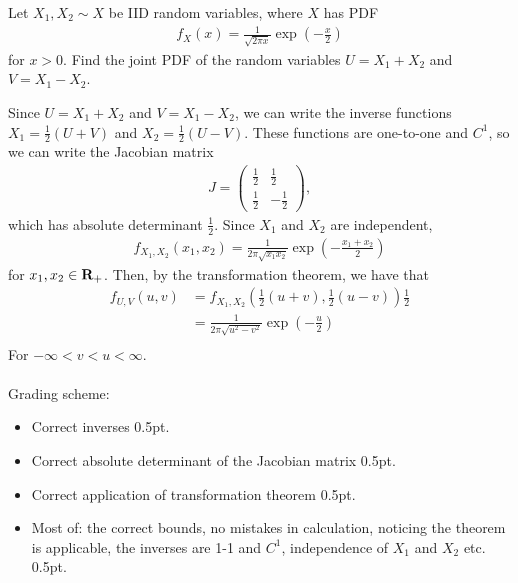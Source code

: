 \begin{exercise}[2]
Let $X_1,X_2\sim X$ be IID random variables, where $X$ has PDF
\begin{align*}
    f_X(x) = \frac{1}{\sqrt{2\pi x}}\exp{\left(-\frac{x}{2}\right)}
\end{align*}
for $x>0$. Find the joint PDF of the random variables $U = X_1+X_2$ and $V = X_1-X_2$.
\begin{solution}
Since $U = X_1 +X_2$ and $V = X_1-X_2$, we can write the inverse functions $X_1 = \frac12(U+V)$ and $X_2 = \frac12(U-V)$. These functions are one-to-one and $C^1$, so we can write the Jacobian matrix
\begingroup
\renewcommand*{\arraystretch}{1.5}
\begin{align*}
    J = \begin{pmatrix}
    \frac12 & \frac12\\
    \frac12 & -\frac12
    \end{pmatrix},
\end{align*}
\endgroup
which has absolute determinant $\frac12$. Since $X_1$ and $X_2$ are independent,
\begin{align*}
    f_{X_1,X_2}(x_1,x_2) = \frac{1}{2\pi\sqrt{x_1x_2}}\exp{\left(-\frac{x_1+x_2}{2}\right)}
\end{align*}
for $x_1,x_2\in\bf{R}_+$. Then, by the transformation theorem, we have that
\begin{align*}
    f_{U,V}(u,v) &= f_{{X_1,X_2}}\left(\frac12(u+v),\frac12(u-v)\right)\frac{1}{2}\\
    &= \frac{1}{2\pi \sqrt{u^2-v^2}}\exp{\left(-\frac{u}{2}\right)}\\
\end{align*}
For $-\infty<v<u<\infty$.
\\\\
Grading scheme:
\begin{itemize}
    \item Correct inverses 0.5pt.
    \item Correct absolute determinant of the Jacobian matrix 0.5pt.
    \item Correct application of transformation theorem 0.5pt.
    \item Most of: the correct bounds, no mistakes in calculation, noticing the theorem is applicable, the inverses are 1-1 and $C^1$, independence of $X_1$ and $X_2$ etc. 0.5pt.
\end{itemize}
\end{solution}
\end{exercise}